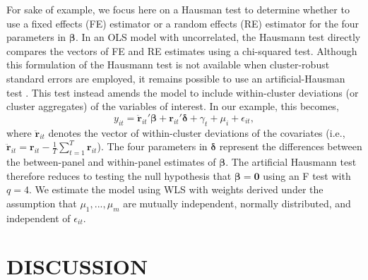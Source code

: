 \documentclass[12pt]{article}\usepackage[]{graphicx}\usepackage[]{color}
\newcommand{\bm}{\mathbf}
\newcommand{\bs}{\boldsymbol}
\begin{document}
For sake of example, we focus here on a Hausman test to determine whether to use a fixed effects (FE) estimator or a random effects (RE) estimator for the four parameters in $\bs\beta$. 
In an OLS model with uncorrelated, the Hausmann test directly compares the vectors of FE and RE estimates using a chi-squared test. 
Although this formulation of the Hausmann test is not available when cluster-robust standard errors are employed, it remains possible to use an artificial-Hausman test \citep{Arellano1993on, Wooldridge2002econometric}. 
This test instead amends the model to include within-cluster deviations (or cluster aggregates) of the variables of interest. In our example, this becomes,
\begin{equation}
y_{it} = \bm{\ddot{r}}_{it}'\bs\beta + \bm{r}_{it}'\bs\delta + \gamma_t + \mu_i + \epsilon_{it},
\end{equation}
where $\bm{\ddot{r}}_{it}$ denotes the vector of within-cluster deviations of the covariates (i.e., $\bm{\ddot{r}}_{it} = \bm{r}_{it} - \frac{1}{T}\sum_{t=1}^T \bm{r}_{it}$).
The four parameters in $\bs\delta$ represent the differences between the between-panel and within-panel estimates of $\bs\beta$. The artificial Hausmann test therefore reduces to testing the null hypothesis that $\bs\beta = \bm{0}$ using an F test with $q = 4$. We estimate the model using WLS with weights derived under the assumption that  $\mu_1,...,\mu_m$ are mutually independent, normally distributed, and independent of $\epsilon_{it}$.

\section{DISCUSSION}
\label{sec:discussion}



\end{document}

